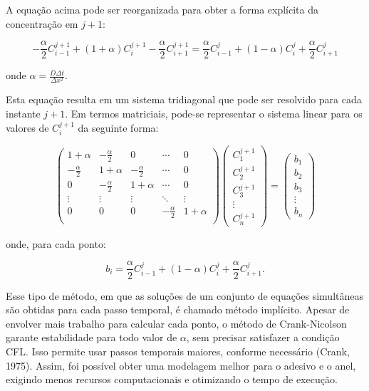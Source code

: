 A equação acima pode ser reorganizada para obter a forma explícita da concentração em $j+1$:

\begin{equation}
- \frac{\alpha}{2} C_{i-1}^{j+1} + (1 + \alpha) C_i^{j+1} - \frac{\alpha}{2} C_{i+1}^{j+1} = \frac{\alpha}{2} C_{i-1}^j + (1 - \alpha) C_i^j + \frac{\alpha}{2} C_{i+1}^j
\end{equation}

\noindent onde \( \alpha = \frac{D \Delta t}{\Delta x^2} \).

Esta equação resulta em um sistema tridiagonal que pode ser resolvido para cada instante \( j+1 \). Em termos matriciais, pode-se representar o sistema linear para os valores de \( C_i^{j+1} \) da seguinte forma:

\[
\begin{pmatrix}
1 + \alpha & -\frac{\alpha}{2} & 0 & \cdots & 0 \\
-\frac{\alpha}{2} & 1 + \alpha & -\frac{\alpha}{2} & \cdots & 0 \\
0 & -\frac{\alpha}{2} & 1 + \alpha & \cdots & 0 \\
\vdots & \vdots & \vdots & \ddots & \vdots \\
0 & 0 & 0 & -\frac{\alpha}{2} & 1 + \alpha \\
\end{pmatrix}
\begin{pmatrix}
C_1^{j+1} \\
C_2^{j+1} \\
C_3^{j+1} \\
\vdots \\
C_n^{j+1}
\end{pmatrix}
=
\begin{pmatrix}
b_1 \\
b_2 \\
b_3 \\
\vdots \\
b_n
\end{pmatrix}
\]

\noindent onde, para cada ponto:

\[
b_i = \frac{\alpha}{2} C_{i-1}^j + (1 - \alpha) C_i^j + \frac{\alpha}{2} C_{i+1}^j.
\]

Esse tipo de método, em que as soluções de um conjunto de equações simultâneas são obtidas para cada passo temporal, é chamado método implícito. Apesar de envolver mais trabalho para calcular cada ponto, o método de Crank-Nicolson garante estabilidade para todo valor de $\alpha$, sem precisar satisfazer a condição CFL. Isso permite usar passos temporais maiores, conforme necessário (Crank, 1975). Assim, foi possível obter uma modelagem melhor para o adesivo e o anel, exigindo menos recursos computacionais e otimizando o tempo de execução. 


